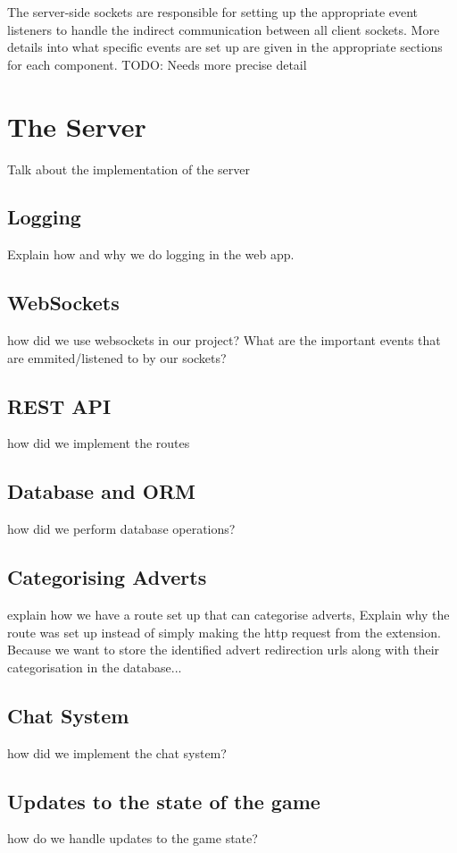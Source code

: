 \documentclass{l4proj}
\begin{document}
The server-side sockets are responsible for setting up the appropriate event listeners to handle the indirect communication between all client sockets. More details into what specific events are set up are given in the appropriate sections for each component.
TODO: Needs more precise detail

\section{The Server}
Talk about the implementation of the server

\subsection{Logging}
Explain how and why we do logging in the web app.

\subsection{WebSockets}
how did we use websockets in our project? What are the important events that are emmited/listened to by our sockets?

\subsection{REST API}
how did we implement the routes

\subsection{Database and ORM}
how did we perform database operations?

\subsection{Categorising Adverts}
explain how we have a route set up that can categorise adverts, Explain why the route was set up instead of simply making the http request from the extension. Because we want to store the identified advert redirection urls along with their categorisation in the database...

\subsection{Chat System}
how did we implement the chat system?

\subsection{Updates to the state of the game}
how do we handle updates to the game state?
\end{document}
